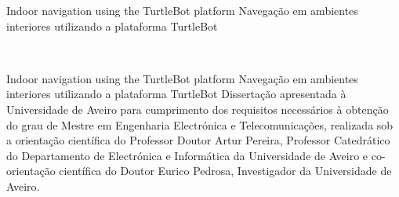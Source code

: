 %
%

\TitlePage
         {\ThesisYear}
        {Indoor navigation using the TurtleBot platform \newline Navegação em ambientes interiores utilizando a plataforma TurtleBot}
        
\EndTitlePage
\titlepage\ \endtitlepage %


%
%

\TitlePage
  \HEADER{}{\ThesisYear}
        {Indoor navigation using the TurtleBot platform \newline Navegação em ambientes interiores utilizando a plataforma TurtleBot}
  \vspace*{15mm}
  \TEXT{}
       {Dissertação apresentada à Universidade de Aveiro para cumprimento dos
requisitos necessários à obtenção do grau de Mestre em Engenharia Electrónica e Telecomunicações, realizada sob a orientação científica do Professor Doutor Artur Pereira, Professor Catedrático do Departamento de
Electrónica e Informática da Universidade de Aveiro e co-orientação científica do Doutor Eurico Pedrosa, Investigador da
Universidade de Aveiro.
        }
        \vspace*{85mm}
\EndTitlePage
\titlepage\ \endtitlepage %

